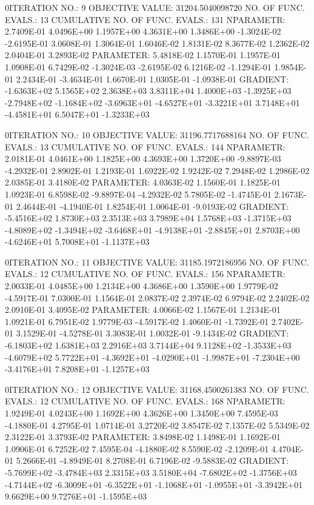 \documentclass[
  letterpaper,
  toc=chapterentrywithdots,
  listof=totoc,
  11pt,
  headings=small,
  usegeometry]{scrreprt}
\begin{document}
\begin{nonmemlisting}
0ITERATION NO.:    9    OBJECTIVE VALUE:   31204.5040098720        NO. OF FUNC. EVALS.:  13
 CUMULATIVE NO. OF FUNC. EVALS.:      131
 NPARAMETR:  2.7409E-01  4.0496E+00  1.1957E+00  4.3631E+00  1.3486E+00 -1.3024E-02 -2.6195E-01  3.0608E-01  1.3064E-01  1.6046E-02
             1.8131E-02  8.3677E-02  1.2362E-02  2.0404E-01  3.2893E-02
 PARAMETER:  5.4818E-02  1.1570E-01  1.1957E-01  1.0908E-01  6.7429E-02 -1.3024E-03 -2.6195E-02  6.1216E-02 -1.1294E-01  1.9854E-01
             2.2434E-01 -3.4634E-01  1.6670E-01  1.0305E-01 -1.0938E-01
 GRADIENT:  -1.6363E+02  5.1565E+02  2.3638E+03  3.8311E+04  1.4000E+03 -1.3925E+03 -2.7948E+02 -1.1684E+02 -3.6963E+01 -4.6527E+01
            -3.3221E+01  3.7148E+01 -4.4581E+01  6.5047E+01 -1.3233E+03

0ITERATION NO.:   10    OBJECTIVE VALUE:   31196.7717688164        NO. OF FUNC. EVALS.:  13
 CUMULATIVE NO. OF FUNC. EVALS.:      144
 NPARAMETR:  2.0181E-01  4.0461E+00  1.1825E+00  4.3693E+00  1.3720E+00 -9.8897E-03 -4.2932E-01  2.8902E-01  1.2193E-01  1.6922E-02
             1.9242E-02  7.2948E-02  1.2986E-02  2.0385E-01  3.4180E-02
 PARAMETER:  4.0363E-02  1.1560E-01  1.1825E-01  1.0923E-01  6.8598E-02 -9.8897E-04 -4.2932E-02  5.7805E-02 -1.4745E-01  2.1673E-01
             2.4644E-01 -4.1940E-01  1.8254E-01  1.0064E-01 -9.0193E-02
 GRADIENT:  -5.4516E+02  1.8730E+03  2.3513E+03  3.7989E+04  1.5768E+03 -1.3715E+03 -4.8089E+02 -1.3494E+02 -3.6468E+01 -4.9138E+01
            -2.8845E+01  2.8703E+00 -4.6246E+01  5.7008E+01 -1.1137E+03

0ITERATION NO.:   11    OBJECTIVE VALUE:   31185.1972186956        NO. OF FUNC. EVALS.:  12
 CUMULATIVE NO. OF FUNC. EVALS.:      156
 NPARAMETR:  2.0033E-01  4.0485E+00  1.2134E+00  4.3686E+00  1.3590E+00  1.9779E-02 -4.5917E-01  7.0300E-01  1.1564E-01  2.0837E-02
             2.3974E-02  6.9794E-02  2.2402E-02  2.0910E-01  3.4095E-02
 PARAMETER:  4.0066E-02  1.1567E-01  1.2134E-01  1.0921E-01  6.7951E-02  1.9779E-03 -4.5917E-02  1.4060E-01 -1.7392E-01  2.7402E-01
             3.1529E-01 -4.5278E-01  3.3083E-01  1.0032E-01 -9.1434E-02
 GRADIENT:  -6.1803E+02  1.6381E+03  2.2916E+03  3.7144E+04  9.1128E+02 -1.3533E+03 -4.6079E+02  5.7722E+01 -4.3692E+01 -4.0290E+01
            -1.9987E+01 -7.2304E+00 -3.4176E+01  7.8208E+01 -1.1257E+03

0ITERATION NO.:   12    OBJECTIVE VALUE:   31168.4500261383        NO. OF FUNC. EVALS.:  12
 CUMULATIVE NO. OF FUNC. EVALS.:      168
 NPARAMETR:  1.9249E-01  4.0243E+00  1.1692E+00  4.3626E+00  1.3450E+00  7.4595E-03 -4.1880E-01  4.2795E-01  1.0714E-01  3.2720E-02
             3.8547E-02  7.1357E-02  5.5349E-02  2.3122E-01  3.3793E-02
 PARAMETER:  3.8498E-02  1.1498E-01  1.1692E-01  1.0906E-01  6.7252E-02  7.4595E-04 -4.1880E-02  8.5590E-02 -2.1209E-01  4.4704E-01
             5.2666E-01 -4.8949E-01  8.2708E-01  6.7196E-02 -9.5883E-02
 GRADIENT:  -5.7699E+02 -3.4784E+03  2.3315E+03  3.5180E+04 -7.6802E+02 -1.3756E+03 -4.7144E+02 -6.3009E+01 -6.3522E+01 -1.1068E+01
            -1.0955E+01 -3.3942E+01  9.6629E+00  9.7276E+01 -1.1595E+03


\end{nonmemlisting}
\end{document}
